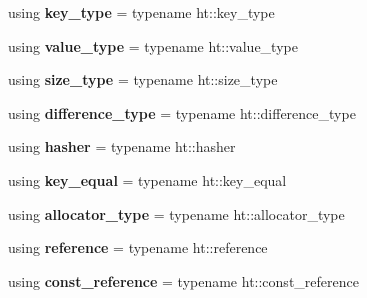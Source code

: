 \begin{DoxyCompactItemize}
\item 
\mbox{\label{classtsl_1_1ordered__set_a02fb4e2e15f314f6ac35c214d9df23ef}} 
using {\bfseries key\+\_\+type} = typename ht\+::key\+\_\+type
\item 
\mbox{\label{classtsl_1_1ordered__set_aa3852aebb63dcde9d151859cb65f951e}} 
using {\bfseries value\+\_\+type} = typename ht\+::value\+\_\+type
\item 
\mbox{\label{classtsl_1_1ordered__set_a2679e2e7b1ac5583afe30254f3fe2391}} 
using {\bfseries size\+\_\+type} = typename ht\+::size\+\_\+type
\item 
\mbox{\label{classtsl_1_1ordered__set_a74aabf02f8feedcae29dc7486d764a9b}} 
using {\bfseries difference\+\_\+type} = typename ht\+::difference\+\_\+type
\item 
\mbox{\label{classtsl_1_1ordered__set_a5223d8468abce9948f98b3b95d1e982c}} 
using {\bfseries hasher} = typename ht\+::hasher
\item 
\mbox{\label{classtsl_1_1ordered__set_a13c68662e5e311f48f70ace69759342f}} 
using {\bfseries key\+\_\+equal} = typename ht\+::key\+\_\+equal
\item 
\mbox{\label{classtsl_1_1ordered__set_a8fbfaf193b1d445d0947dfc5678b6855}} 
using {\bfseries allocator\+\_\+type} = typename ht\+::allocator\+\_\+type
\item 
\mbox{\label{classtsl_1_1ordered__set_a958a0120052bda326fb7bf72e9878a5c}} 
using {\bfseries reference} = typename ht\+::reference
\item 
\mbox{\label{classtsl_1_1ordered__set_a213465f357963c30b084451ad61299ac}} 
using {\bfseries const\+\_\+reference} = typename ht\+::const\+\_\+reference
\item 
\mbox{\label{classtsl_1_1ordered__set_a274eb7795de5ce31fa932e97ccb255cb}} 

\end{DoxyCompactItemize}
